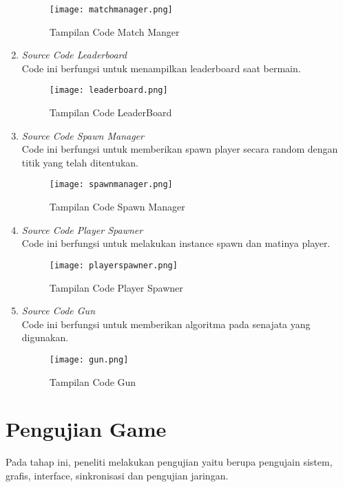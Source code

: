 \begin{enumerate}
    \newpage
    \begin{figure}[h]
        \centering
        \texttt{[image: matchmanager.png]}
        \caption{Tampilan Code Match Manger}
        \label{fig:matchmanager}
    \end{figure}
    \item \textit{Source Code Leaderboard} \\ 
    Code ini berfungsi untuk menampilkan leaderboard saat bermain.
    \begin{figure}[h]
        \centering
        \texttt{[image: leaderboard.png]}
        \caption{Tampilan Code LeaderBoard}
        \label{fig:leaderboard}
    \end{figure}
    \item \textit{Source Code Spawn Manager}\\
    Code ini berfungsi untuk memberikan spawn player secara random dengan titik yang telah ditentukan.
   \newpage
    \begin{figure}[h]
        \centering
        \texttt{[image: spawnmanager.png]}
        \caption{Tampilan Code Spawn Manager}
        \label{fig:spawnmanager}
    \end{figure}
    \item \textit{Source Code Player Spawner} \\ 
    Code ini berfungsi untuk melakukan instance spawn dan matinya player.
    \begin{figure}[h]
        \centering
        \texttt{[image: playerspawner.png]}
        \caption{Tampilan Code Player Spawner}
        \label{fig:playerspawner}
    \end{figure}
    \item \textit{Source Code Gun} \\ 
    Code ini berfungsi untuk memberikan algoritma pada senajata yang digunakan.
    \newpage
    \begin{figure}[h]
        \centering
        \texttt{[image: gun.png]}
        \caption{Tampilan Code Gun}
        \label{fig:gun}
    \end{figure}
\end{enumerate}

\section{Pengujian Game}
\noindent

Pada tahap ini, peneliti melakukan pengujian yaitu berupa pengujain sistem, grafis, interface, sinkronisasi dan pengujian jaringan.


